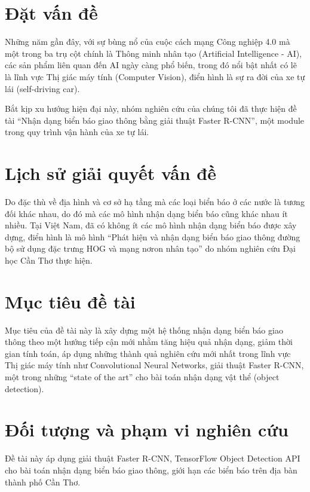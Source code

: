 \documentclass[../thesis.tex]{subfiles}
\begin{document}
\section{Đặt vấn đề}

Những năm gần đây, với sự bùng nổ của cuộc cách mạng Công nghiệp 4.0 mà một trong ba trụ cột chính là Thông minh nhân tạo (Artificial Intelligence - AI), các sản phẩm liên quan đến AI ngày càng phổ biến, trong đó nổi bật nhất có lẽ là lĩnh vực Thị giác máy tính (Computer Vision), điển hình là sự ra đời của xe tự lái (self-driving car). 

Bắt kịp xu hướng hiện đại này, nhóm nghiên cứu của chúng tôi đã thực hiện đề tài ``Nhận dạng biển báo giao thông bằng giải thuật Faster R-CNN'', một module trong quy trình vận hành của xe tự lái.

\section{Lịch sử giải quyết vấn đề}

Do đặc thù về địa hình và cơ sở hạ tầng mà các loại biển báo ở các nước là tương đối khác nhau, do đó mà các mô hình nhận dạng biển báo cũng khác nhau ít nhiều. Tại Việt Nam, đã có không ít các mô hình nhận dạng biển báo được xây dựng, điển hình là mô hình ``Phát hiện và nhận dạng biển báo giao thông đường bộ sử dụng đặc trưng HOG và mạng nơron nhân tạo'' do nhóm nghiên cứu Đại học Cần Thơ thực hiện\cite{nhandangbienbaodhct}.

\section{Mục tiêu đề tài}

Mục tiêu của đề tài này là xây dựng một hệ thống nhận dạng biển báo giao thông theo một hướng tiếp cận mới nhằm tăng hiệu quả nhận dạng, giảm thời gian tính toán, áp dụng những thành quả nghiên cứu mới nhất trong lĩnh vực Thị giác máy tính như Convolutional Neural Networks, giải thuật Faster R-CNN\cite{renNIPS15fasterrcnn}, một trong những ``state of the art'' cho bài toán nhận dạng vật thể (object detection).

\section{Đối tượng và phạm vi nghiên cứu}

Đề tài này áp dụng giải thuật Faster R-CNN, TensorFlow Object Detection API\cite{DBLP:journals/corr/HuangRSZKFFWSG016} cho bài toán nhận dạng biển báo giao thông, giới hạn các biển báo trên địa bàn thành phố Cần Thơ. 
\end{document}
